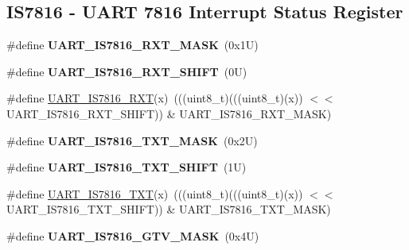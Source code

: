 \subsection*{I\+S7816 -\/ U\+A\+RT 7816 Interrupt Status Register}
\begin{DoxyCompactItemize}
\item 
\mbox{\label{group___u_a_r_t___register___masks_ga70556c9c160817cdae5da7b0e96d755e}} 
\#define {\bfseries U\+A\+R\+T\+\_\+\+I\+S7816\+\_\+\+R\+X\+T\+\_\+\+M\+A\+SK}~(0x1\+U)
\item 
\mbox{\label{group___u_a_r_t___register___masks_ga189a4242177b8a2ebe2cd216a1fdfb41}} 
\#define {\bfseries U\+A\+R\+T\+\_\+\+I\+S7816\+\_\+\+R\+X\+T\+\_\+\+S\+H\+I\+FT}~(0\+U)
\item 
\#define \mbox{\hyperlink{group___u_a_r_t___register___masks_ga2e07a29afc64917b4d040b221e2ea415}{U\+A\+R\+T\+\_\+\+I\+S7816\+\_\+\+R\+XT}}(x)~(((uint8\+\_\+t)(((uint8\+\_\+t)(x)) $<$$<$ U\+A\+R\+T\+\_\+\+I\+S7816\+\_\+\+R\+X\+T\+\_\+\+S\+H\+I\+FT)) \& U\+A\+R\+T\+\_\+\+I\+S7816\+\_\+\+R\+X\+T\+\_\+\+M\+A\+SK)
\item 
\mbox{\label{group___u_a_r_t___register___masks_gae05e13012c95c5f0ebc11ec8a0d474c6}} 
\#define {\bfseries U\+A\+R\+T\+\_\+\+I\+S7816\+\_\+\+T\+X\+T\+\_\+\+M\+A\+SK}~(0x2\+U)
\item 
\mbox{\label{group___u_a_r_t___register___masks_ga460ed2c07230c4c0de6ae3701a1f84f1}} 
\#define {\bfseries U\+A\+R\+T\+\_\+\+I\+S7816\+\_\+\+T\+X\+T\+\_\+\+S\+H\+I\+FT}~(1\+U)
\item 
\#define \mbox{\hyperlink{group___u_a_r_t___register___masks_gaa1871af657f4b1ccc1968d276e6f465a}{U\+A\+R\+T\+\_\+\+I\+S7816\+\_\+\+T\+XT}}(x)~(((uint8\+\_\+t)(((uint8\+\_\+t)(x)) $<$$<$ U\+A\+R\+T\+\_\+\+I\+S7816\+\_\+\+T\+X\+T\+\_\+\+S\+H\+I\+FT)) \& U\+A\+R\+T\+\_\+\+I\+S7816\+\_\+\+T\+X\+T\+\_\+\+M\+A\+SK)
\item 
\mbox{\label{group___u_a_r_t___register___masks_ga863b3dbfbf807a29466c8acf12054673}} 
\#define {\bfseries U\+A\+R\+T\+\_\+\+I\+S7816\+\_\+\+G\+T\+V\+\_\+\+M\+A\+SK}~(0x4\+U)
\item 
\mbox{\label{group___u_a_r_t___register___masks_ga522eab69113bfd36e6f58835baa045a8}} 

\end{DoxyCompactItemize}
